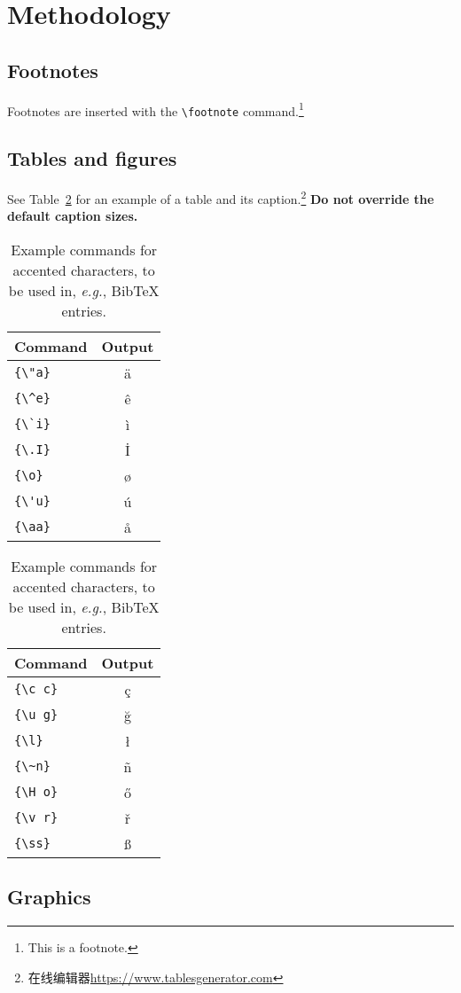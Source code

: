 \section{Methodology}
\label{sec:methodology}
 
\subsection{Footnotes}

Footnotes are inserted with the \verb|\footnote| command.\footnote{This is a footnote.}

\subsection{Tables and figures}

See Table~\ref{tab:accents} for an example of a table and its caption.\footnote{在线编辑器\url{https://www.tablesgenerator.com}}
\textbf{Do not override the default caption sizes.}

\begin{table}
	\centering
	\begin{tabular}{lc}
		\hline
		\textbf{Command} & \textbf{Output}\\
		\hline
		\verb|{\"a}| & {\"a} \\
		\verb|{\^e}| & {\^e} \\
		\verb|{\`i}| & {\`i} \\ 
		\verb|{\.I}| & {\.I} \\ 
		\verb|{\o}| & {\o} \\
		\verb|{\'u}| & {\'u}  \\ 
		\verb|{\aa}| & {\aa}  \\\hline
	\end{tabular}
	\begin{tabular}{lc}
		\hline
		\textbf{Command} & \textbf{Output}\\
		\hline
		\verb|{\c c}| & {\c c} \\ 
		\verb|{\u g}| & {\u g} \\ 
		\verb|{\l}| & {\l} \\ 
		\verb|{\~n}| & {\~n} \\ 
		\verb|{\H o}| & {\H o} \\ 
		\verb|{\v r}| & {\v r} \\ 
		\verb|{\ss}| & {\ss} \\
		\hline
	\end{tabular}
	\caption{Example commands for accented characters, to be used in, \emph{e.g.}, Bib\TeX{} entries. }
	\label{tab:accents}
\end{table}

 \subsection{Graphics}
 
 

